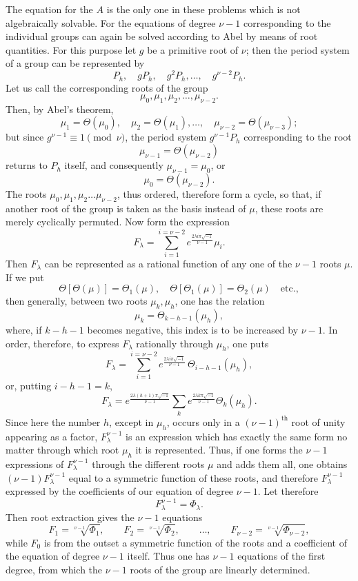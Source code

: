 \documentclass[10pt]{article}
\begin{document}
The equation for the \(A\) is the only one in these problems which is not algebraically solvable. For the equations of degree \(\nu-1\) corresponding to the individual groups can again be solved according to Abel by means of root quantities. For this purpose let \(g\) be a primitive root of \(\nu\); then the period system of a group can be represented by
\[
P_h,\quad gP_h,\quad g^2P_h,\ldots,\quad g^{\nu-2}P_h.
\]
Let us call the corresponding roots of the group
\[
\mu_0,\mu_1,\mu_2,\ldots,\mu_{\nu-2}.
\]
Then, by Abel's theorem,
\[
\mu_1=\Theta(\mu_0),\quad
\mu_2=\Theta(\mu_1),\ldots,\quad
\mu_{\nu-2}=\Theta(\mu_{\nu-3});
\]
but since \(g^{\nu-1}\equiv 1\pmod{\nu}\), the period system \(g^{\nu-1}P_h\) corresponding to the root
\[
\mu_{\nu-1}=\Theta(\mu_{\nu-2})
\]
returns to \(P_h\) itself, and consequently \(\mu_{\nu-1}=\mu_0\), or
\[
\mu_0=\Theta(\mu_{\nu-2}).
\]
The roots \(\mu_0,\mu_1,\mu_2\ldots\mu_{\nu-2}\), thus ordered, therefore form a cycle, so that, if another root of the group is taken as the basis instead of \(\mu\), these roots are merely cyclically permuted. Now form the expression
\[
F_\lambda=\sum_{i=1}^{i=\nu-2}
e^{\frac{2\lambda i\pi\sqrt{-1}}{\nu-1}}\mu_i.
\]
Then \(F_\lambda\) can be represented as a rational function of any one of the \(\nu-1\) roots \(\mu\). If we put
\[
\Theta[\Theta(\mu)]=\Theta_1(\mu),\quad
\Theta[\Theta_1(\mu)]=\Theta_2(\mu)\quad\text{etc.},
\]
then generally, between two roots \(\mu_k,\mu_h\), one has the relation
\[
\mu_k=\Theta_{k-h-1}(\mu_h),
\]
where, if \(k-h-1\) becomes negative, this index is to be increased by \(\nu-1\). In order, therefore, to express \(F_\lambda\) rationally through \(\mu_h\), one puts
\[
F_\lambda=
\sum_{i=1}^{i=\nu-2}
e^{\frac{2\lambda i\pi\sqrt{-1}}{\nu-1}}\,
\Theta_{i-h-1}(\mu_h),
\]
or, putting \(i-h-1=k\),
\[
F_\lambda=
e^{\frac{2\lambda(h+1)\pi\sqrt{-1}}{\nu-1}}
\sum_{k}
e^{\frac{2\lambda k\pi\sqrt{-1}}{\nu-1}}\Theta_k(\mu_h).
\]
Since here the number \(h\), except in \(\mu_h\), occurs only in a \((\nu-1)^{\text{th}}\) root of unity appearing as a factor, \(F_\lambda^{\nu-1}\) is an expression which has exactly the same form no matter through which root \(\mu_h\) it is represented. Thus, if one forms the \(\nu-1\) expressions of \(F_\lambda^{\nu-1}\) through the different roots \(\mu\) and adds them all, one obtains \((\nu-1)F_\lambda^{\nu-1}\) equal to a symmetric function of these roots, and therefore \(F_\lambda^{\nu-1}\) expressed by the coefficients of our equation of degree \(\nu-1\). Let therefore
\[
F_\lambda^{\nu-1}=\Phi_\lambda.
\]
Then root extraction gives the \(\nu-1\) equations
\[
F_1=\sqrt[\nu-1]{\Phi_1},\qquad
F_2=\sqrt[\nu-1]{\Phi_2},\qquad
\ldots,\qquad
F_{\nu-2}=\sqrt[\nu-1]{\Phi_{\nu-2}},
\]
while \(F_0\) is from the outset a symmetric function of the roots and a coefficient of the equation of degree \(\nu-1\) itself. Thus one has \(\nu-1\) equations of the first degree, from which the \(\nu-1\) roots of the group are linearly determined.
\end{document}
